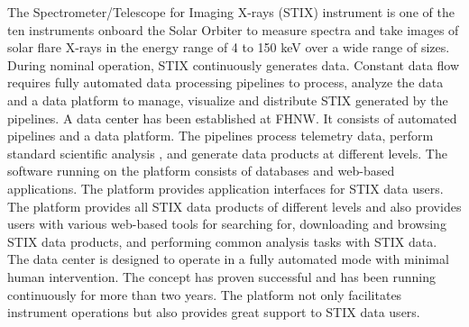 \documentclass[referee]{aa} %
\begin{document}
  \abstract
   { The Spectrometer/Telescope for Imaging X-rays (STIX) instrument is one 
   of the ten instruments onboard the Solar Orbiter to measure spectra and take images of solar flare X-rays in the energy range of 4 to 150 keV over a wide range of sizes.} %
   {During nominal operation, STIX continuously generates data. Constant data flow requires fully automated data processing pipelines to process,
     analyze the data and a data platform to manage, 
   visualize and distribute STIX generated by the pipelines.   
   }
   {
   A data center has been established at FHNW. 
   It consists of automated pipelines and a data platform.
   The pipelines process telemetry data, perform standard scientific analysis 
    , and generate data products at different levels.  
   The software running on the platform 
   consists of databases and web-based applications. The platform provides application interfaces for STIX data users. }
   {
 The platform provides  all STIX data products of different levels and also provides users 
 with various web-based tools for searching for, downloading and  browsing STIX data products, 
 and performing common analysis tasks with STIX data. 
  The data center is designed to operate in a fully automated mode with minimal human intervention. The concept has proven successful 
 and has been running continuously for more than two years. The platform not only facilitates instrument operations but also provides great support to STIX data users.}
 {}
   \maketitle

\end{document}
